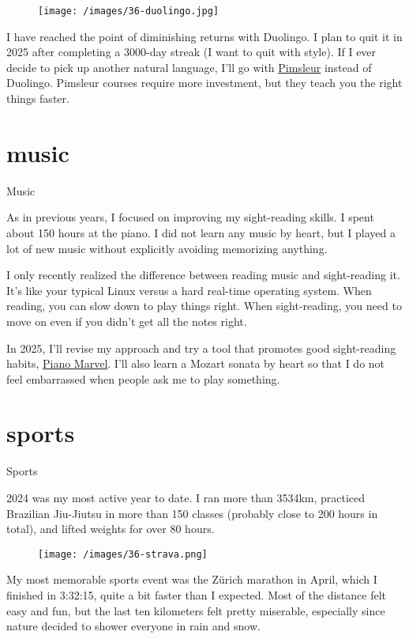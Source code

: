 \documentclass{article}
\begin{document}
\begin{figure}[medium-size,center]
\texttt{[image: /images/36-duolingo.jpg]}
\end{figure}

I have reached the point of diminishing returns with Duolingo.
I plan to quit it in 2025 after completing a 3000-day streak (I want to quit with style).
If I ever decide to pick up another natural language, I’ll go with \href{https://www.pimsleur.com/}{Pimsleur} instead of Duolingo.
Pimsleur courses require more investment, but they teach you the right things faster.

\section{music}{Music}

As in previous years, I focused on improving my sight-reading skills.
I spent about 150 hours at the piano.
I did not learn any music by heart, but I played a lot of new music without explicitly avoiding memorizing anything.

I only recently realized the difference between reading music and sight-reading it.
It's like your typical Linux versus a hard real-time operating system.
When reading, you can slow down to play things right.
When sight-reading, you need to move on even if you didn't get all the notes right.

In 2025, I'll revise my approach and try a tool that promotes good sight-reading habits, \href{https://pianomarvel.com/}{Piano Marvel}.
I'll also learn a Mozart sonata by heart so that I do not feel embarrassed when people ask me to play something.

\section{sports}{Sports}

2024 was my most active year to date.
I ran more than 3534km, practiced Brazilian Jiu-Jiutsu in more than 150 classes (probably close to 200 hours in total), and lifted weights for over 80 hours.

\begin{figure}[medium-size,center]
\texttt{[image: /images/36-strava.png]}
\end{figure}

My most memorable sports event was the Zürich marathon in April, which I finished in 3:32:15, quite a bit faster than I expected.
Most of the distance felt easy and fun, but the last ten kilometers felt pretty miserable, especially since nature decided to shower everyone in rain and snow.
\end{document}
